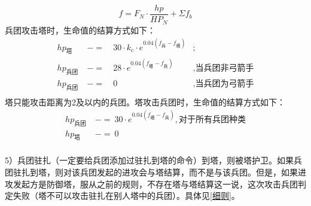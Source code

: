 \documentclass[a4paper,4pt]{article}
\begin{document}
\begin{equation}
  f = F_N \cdot \frac{hp}{HP_N} + \Sigma f_b\label{f}
\end{equation}
兵团攻击塔时，生命值的结算方式如下：
\begin{equation}
  \begin{aligned}
    hp_{\text{塔}}   & \ -= & \ 30 \cdot k_c \cdot e^{0.04(f_{\text{兵}}-f_{\text{塔}})} & ;                       \\
    hp_{\text{兵团}} & \ -= & \ 28 \cdot e^{0.04(f_{\text{塔}}-f_{\text{兵}})}           & , \text{当兵团非弓箭手} \\
    hp_{\text{兵团}} & \ -= & \ 0                                                        & , \text{当兵团为弓箭手} \\
  \end{aligned}
  \label{hp1}
\end{equation}
塔只能攻击距离为2及以内的兵团。塔攻击兵团时，生命值的结算方式如下：
\begin{equation}
  \begin{aligned}
    hp_{\text{兵团}} & \ -=\ 30 \cdot e^{0.04(f_{\text{塔}}-f_{\text{兵}})}, \text{对于所有兵团种类} \\
    hp_{\text{塔}}   & \ -=\ 0                                                                       \\
  \end{aligned}
  \label{hp2}
\end{equation}
\par
5）兵团驻扎（一定要给兵团添加过驻扎到塔的命令）到塔，则被塔护卫。如果兵团驻扎到塔，则对该兵团发起的进攻会与塔结算，而不是与该兵团。但是，如果进攻发起方是防御塔，服从之前的规则，不存在塔与塔结算这一说，这次攻击兵团判定失败（塔不可以攻击驻扎在别人塔中的兵团）。具体见\ref{细则}。\par
\end{document}

